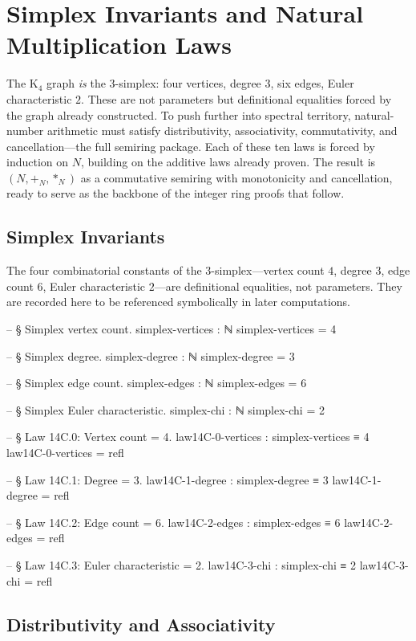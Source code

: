 \documentclass[11pt,a4paper]{book}
\def\mathbb#1{#1}%
\begin{document}
\chapter{Simplex Invariants and Natural Multiplication Laws}

The K$_4$ graph \emph{is} the $3$-simplex: four vertices, degree $3$, six edges, Euler characteristic $2$. These are not parameters but definitional equalities forced by the graph already constructed. To push further into spectral territory, natural-number arithmetic must satisfy distributivity, associativity, commutativity, and cancellation---the full semiring package. Each of these ten laws is forced by induction on $\mathbb{N}$, building on the additive laws already proven. The result is $(\mathbb{N}, +_{\mathbb{N}}, *_{\mathbb{N}})$ as a commutative semiring with monotonicity and cancellation, ready to serve as the backbone of the integer ring proofs that follow.

\section{Simplex Invariants}

The four combinatorial constants of the $3$-simplex---vertex count $4$, degree $3$, edge count $6$, Euler characteristic $2$---are definitional equalities, not parameters. They are recorded here to be referenced symbolically in later computations.

\begin{code}
-- § Simplex vertex count.
simplex-vertices : ℕ
simplex-vertices = 4

-- § Simplex degree.
simplex-degree : ℕ
simplex-degree = 3

-- § Simplex edge count.
simplex-edges : ℕ
simplex-edges = 6

-- § Simplex Euler characteristic.
simplex-chi : ℕ
simplex-chi = 2

-- § Law 14C.0: Vertex count = 4.
law14C-0-vertices : simplex-vertices ≡ 4
law14C-0-vertices = refl

-- § Law 14C.1: Degree = 3.
law14C-1-degree : simplex-degree ≡ 3
law14C-1-degree = refl

-- § Law 14C.2: Edge count = 6.
law14C-2-edges : simplex-edges ≡ 6
law14C-2-edges = refl

-- § Law 14C.3: Euler characteristic = 2.
law14C-3-chi : simplex-chi ≡ 2
law14C-3-chi = refl
\end{code}

\section{Distributivity and Associativity}
\end{document}
